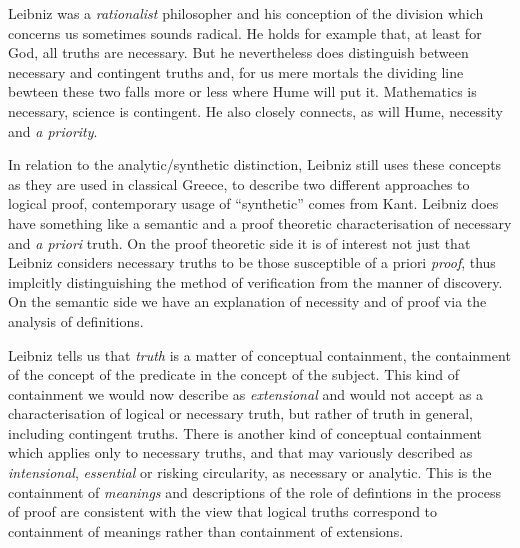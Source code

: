 Leibniz was a \emph{rationalist} philosopher and his conception of the division which concerns us sometimes sounds radical.
He holds for example that, at least for God, all truths are necessary.
But he nevertheless does distinguish between necessary and contingent truths and, for us mere mortals the dividing line bewteen these two falls more or less where Hume will put it.
Mathematics is necessary, science is contingent.
He also closely connects, as will Hume, necessity and \emph{a priority}.

In relation to the analytic/synthetic distinction, Leibniz still uses these concepts as they are used in classical Greece, to describe two different approaches to logical proof, contemporary usage of ``synthetic'' comes from Kant.
Leibniz does have something like a semantic and a proof theoretic characterisation of necessary and \emph{a priori} truth.
On the proof theoretic side it is of interest not just that Leibniz considers necessary truths to be those susceptible of a priori \emph{proof}, thus implcitly distinguishing the method of verification from the manner of discovery. 
On the semantic side we have an explanation of necessity and of proof via the analysis of definitions.

Leibniz tells us that \emph{truth} is a matter of conceptual containment, the containment of the concept of the predicate in the concept of the subject.
This kind of containment we would now describe as \emph{extensional} and would not accept as a characterisation of logical or necessary truth, but rather of truth in general, including contingent truths.
There is another kind of conceptual containment which applies only to necessary truths, and that may variously described as \emph{intensional}, \emph{essential} or risking circularity, as necessary or analytic.
This is the containment of \emph{meanings} and descriptions of the role of defintions in the process of proof are consistent with the view that logical truths correspond to containment of meanings rather than containment of extensions.

